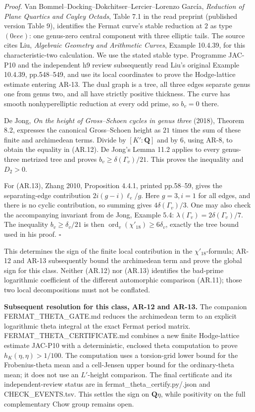 \emph{Proof.} Van Bommel--Docking--Dokchitser--Lercier--Lorenzo García,
\emph{Reduction of Plane Quartics and Cayley Octads}, Table 7.1 in the
read preprint (published version Table 9), identifies the Fermat curve's
stable reduction at \(2\) as type \((0eee)\): one genus-zero central
component with three elliptic tails. The source cites Liu,
\emph{Algebraic Geometry and Arithmetic Curves}, Example 10.4.39, for
this characteristic-two calculation. We use the stated stable type.
Programme JAC-P10 and the independent h9 review subsequently read Liu's
original Example 10.4.39, pp.548--549, and use its local coordinates to
prove the Hodge-lattice estimate entering AR-13. The dual graph is a
tree, all three edges separate genus one from genus two, and all have
strictly positive thickness. The curve has smooth nonhyperelliptic
reduction at every odd prime, so \(b_v=0\) there.

De Jong, \emph{On the height of Gross--Schoen cycles in genus three}
(2018), Theorem 8.2, expresses the canonical Gross--Schoen height as
\(21\) times the sum of these finite and archimedean terms. Divide by
\([K':\mathbf Q]\) and by \(6\), using AR-8, to obtain the equality in
(AR.12). De Jong's Lemma 11.2 applies to every genus-three metrized tree
and proves \(b_v\ge\delta(\Gamma_v)/21\). This proves the inequality and
\(D_2>0\).

For (AR.13), Zhang 2010, Proposition 4.4.1, printed pp.58--59, gives the
separating-edge contribution \(2i(g-i)\ell_e/g\). Here \(g=3,i=1\) for
all edges, and there is no cyclic contribution, so summing gives
\(4\delta(\Gamma_v)/3\). One may also check the accompanying invariant
from de Jong, Example 5.4: \(\lambda(\Gamma_v)=2\delta(\Gamma_v)/7\).
The inequality \(b_v\ge\delta_v/21\) is then
\(\operatorname{ord}_v(\chi'_{18})\ge6\delta_v\), exactly the tree bound
used in his proof. \(\square\)

This determines the sign of the finite local contribution in the
\(\chi'_{18}\)-formula; AR-12 and AR-13 subsequently bound the
archimedean term and prove the global sign for this class. Neither
(AR.12) nor (AR.13) identifies the bad-prime logarithmic coefficient of
the different automorphic comparison (AR.11); those two local
decompositions must not be conflated.

\textbf{Subsequent resolution for this class, AR-12 and AR-13.} The
companion FERMAT\_THETA\_GATE.md reduces the archimedean term to an
explicit logarithmic theta integral at the exact Fermat period matrix.
FERMAT\_THETA\_CERTIFICATE.md combines a new finite Hodge-lattice
estimate JAC-P10 with a deterministic, enclosed theta computation to
prove \(h_K(\eta,\eta)>1/100\). The computation uses a torsion-grid
lower bound for the Frobenius-theta mean and a cell-Jensen upper bound
for the ordinary-theta mean; it does not use an \(L'\)-height
comparison. The final certificate and its independent-review status are
in fermat\_theta\_certify.py/.json and CHECK\_EVENTS.tsv. This settles
the sign on \(\mathbf Q\eta\), while positivity on the full
complementary Chow group remains open.

